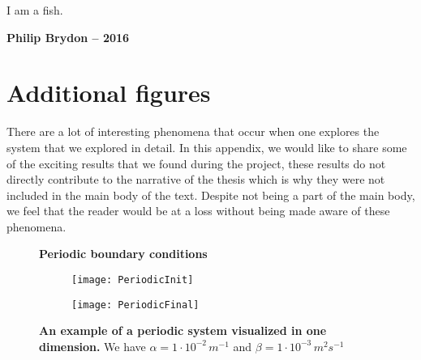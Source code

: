 \setlength{}
\epigraph{I am a fish.}{\textbf{Philip Brydon -- 2016}}
\chapter{Additional figures}

There are a lot of interesting phenomena that occur when one explores the system that we explored in detail. In this appendix, we would like to share some of the exciting results that we found during the project, these results do not directly contribute to the narrative of the thesis which is why they were not included in the main body of the text. Despite not being a part of the main body, we feel that the reader would be at a loss without being made aware of these phenomena.

\begin{figure}
	\center
	\textbf{Periodic boundary conditions}
	\vspace{0.5cm}

	\begin{subfigure}{0.49\textwidth}
		\texttt{[image: PeriodicInit]}
	\end{subfigure}
	\begin{subfigure}{0.49\textwidth}
		\texttt{[image: PeriodicFinal]}
	\end{subfigure}
	\caption{\textbf{An example of a periodic system visualized in one dimension.} We have $\alpha = 1 \cdot 10^{-2} \, m^{-1}$ and $\beta = 1 \cdot 10^{-3}  \, m^2 s^{-1}$}
\end{figure}